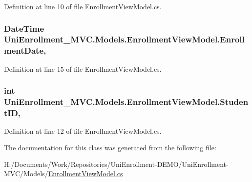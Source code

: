 Definition at line 10 of file Enrollment\+View\+Model.\+cs.

\subsubsection[{\texorpdfstring{Enrollment\+Date}{EnrollmentDate}}]{\setlength{\rightskip}{0pt plus 5cm}Date\+Time Uni\+Enrollment\+\_\+\+M\+V\+C.\+Models.\+Enrollment\+View\+Model.\+Enrollment\+Date\hspace{0.3cm}{\ttfamily [get]}, {\ttfamily [set]}}\hypertarget{class_uni_enrollment___m_v_c_1_1_models_1_1_enrollment_view_model_ac4df04e11eccbb18ec3e8304ac7fbc0e}{}\label{class_uni_enrollment___m_v_c_1_1_models_1_1_enrollment_view_model_ac4df04e11eccbb18ec3e8304ac7fbc0e}


Definition at line 15 of file Enrollment\+View\+Model.\+cs.

\subsubsection[{\texorpdfstring{Student\+ID}{StudentID}}]{\setlength{\rightskip}{0pt plus 5cm}int Uni\+Enrollment\+\_\+\+M\+V\+C.\+Models.\+Enrollment\+View\+Model.\+Student\+ID\hspace{0.3cm}{\ttfamily [get]}, {\ttfamily [set]}}\hypertarget{class_uni_enrollment___m_v_c_1_1_models_1_1_enrollment_view_model_a37ef31b609762bd1d4db2944dbbb42a0}{}\label{class_uni_enrollment___m_v_c_1_1_models_1_1_enrollment_view_model_a37ef31b609762bd1d4db2944dbbb42a0}


Definition at line 12 of file Enrollment\+View\+Model.\+cs.



The documentation for this class was generated from the following file\+:\begin{DoxyCompactItemize}
\item 
H\+:/\+Documents/\+Work/\+Repositories/\+Uni\+Enrollment-\/\+D\+E\+M\+O/\+Uni\+Enrollment-\/\+M\+V\+C/\+Models/\hyperlink{_enrollment_view_model_8cs}{Enrollment\+View\+Model.\+cs}\end{DoxyCompactItemize}
